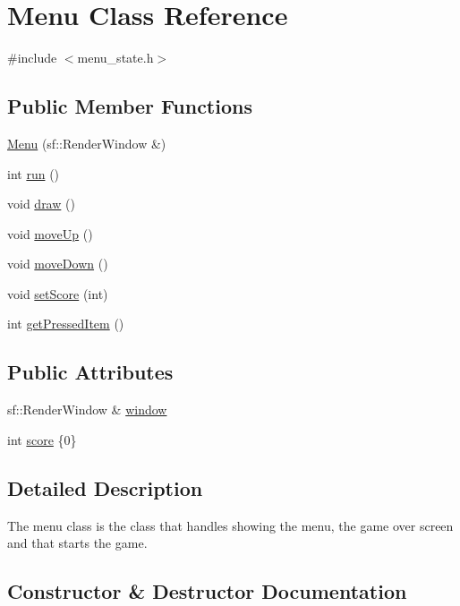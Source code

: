 \hypertarget{classMenu}{}\section{Menu Class Reference}
\label{classMenu}


{\ttfamily \#include $<$menu\+\_\+state.\+h$>$}

\subsection*{Public Member Functions}
\begin{DoxyCompactItemize}
\item 
\hyperlink{classMenu_aff5b4e8e5376fec2d1929bfb30f802ed}{Menu} (sf\+::\+Render\+Window \&)
\item 
int \hyperlink{classMenu_af93a970cdfec463a8cb25ca65bf51da5}{run} ()
\item 
void \hyperlink{classMenu_a2cd7ab9901a8f42a3ae977d0774398a6}{draw} ()
\item 
void \hyperlink{classMenu_abfa1619b1d868d85b3978f5918c2a56f}{move\+Up} ()
\item 
void \hyperlink{classMenu_abbec620bd41608fba287400ead4467aa}{move\+Down} ()
\item 
void \hyperlink{classMenu_a9516e2d4872c03ba5a436216d1729e35}{set\+Score} (int)
\item 
int \hyperlink{classMenu_a6cb35aed2a232dcc0859c3b4e419454c}{get\+Pressed\+Item} ()
\end{DoxyCompactItemize}
\subsection*{Public Attributes}
\begin{DoxyCompactItemize}
\item 
sf\+::\+Render\+Window \& \hyperlink{classMenu_a56a1907bf19e3ccdfbd31189c71fc18c}{window}
\item 
int \hyperlink{classMenu_a7e426cd425c8d7e898c6b80e59339e5f}{score} \{0\}
\end{DoxyCompactItemize}


\subsection{Detailed Description}
The menu class is the class that handles showing the menu, the game over screen and that starts the game. 

\subsection{Constructor \& Destructor Documentation}
\mbox{\label{classMenu_aff5b4e8e5376fec2d1929bfb30f802ed}} 
